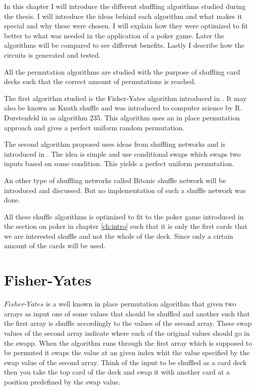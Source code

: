 
In this chapter I will introduce the different shuffling algorithms studied during the thesis. I will introduce the ideas behind each algorithm and what makes it special and why these were chosen. I will explain how they were optimized to fit better to what was needed in the application of a poker game. Later the algorithms will be compared to see different benefits. Lastly I describe how the circuits is generated and tested.

All the permutation algorithms are studied with the purpose of shuffling card decks such that the correct amount of permutations is reached. 

The first algorithm studied is the Fisher-Yates algorithm introduced in . It may also be known as Knuth shuffle and was introduced to computer science by R. Durstenfeld in  as algorithm 235. This algorithm uses an in place permutation approach and gives a perfect uniform random permutation.

The second algorithm proposed uses ideas from shuffling networks and is introduced in . The idea is simple and use conditional swaps which swaps two inputs based on some condition. This yields a perfect uniform permutation.

An other type of shuffling networks called Bitonic shuffle network will be introduced and discussed. But no implementation of such a shuffle network was done.

All these shuffle algorithms is optimized to fit to the poker game introduced in the section on poker in chapter \ref{ch:intro} such that it is only the first cards that we are interested shuffle and not the whole of the deck. Since only a cirtain amount of the cards will be used.


\section{Fisher-Yates}

$Fisher\text{-}Yates$ is a well known in place permutation algorithm that given two arrays as input one of some values that should be shuffled and another such that the first array is shuffle accordingly to the values of the second array. These swap values of the second array indicate where each of the original values should go in the swapp. When the algorithm runs through the first array which is supposed to be permuted it swaps the value at an given index whit the value specified by the swap value of the second array. Think of the input to be shuffled as a card deck then you take the top card of the deck and swap it with another card at a position predefined by the swap value.

